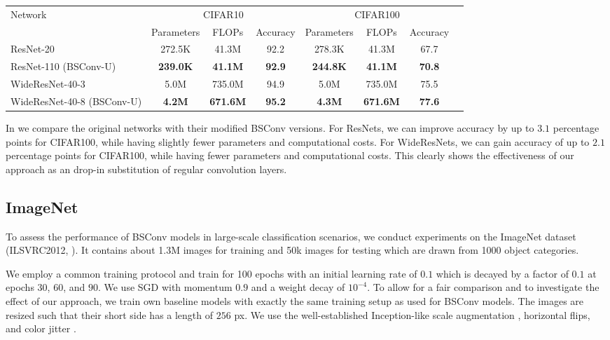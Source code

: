 \documentclass[10pt,twocolumn,letterpaper]{article}
\newcommand{\DCCK}{BSConv\xspace}
\newcommand{\DCCKU}{\DCCK-U\xspace}
\begin{document}
\begin{table*}
	\begin{center}
		\begin{tabular}{|l|c|c|c|c|c|c|c|}
			\hline
			Network & \multicolumn{3}{|c|}{CIFAR10} & \multicolumn{3}{|c|}{CIFAR100} \\
			 &  Parameters & FLOPs & Accuracy & Parameters & FLOPs & Accuracy \\
			\hline
			ResNet-20 \cite{he2016deep} 	& 272.5K & 41.3M & 92.2 & 278.3K & 41.3M & 67.7 \\
			ResNet-110 (\DCCKU) 			& \bf{239.0K} & \bf{41.1M} & \bf{92.9} & \bf{244.8K} & \bf{41.1M} & \bf{70.8} \\
			\hline
			WideResNet-40-3 \cite{zagoruyko2016wide} & 5.0M & 735.0M & 94.9 & 5.0M & 735.0M & 75.5 \\
			WideResNet-40-8 (\DCCKU)	 	& \bf{4.2M} & \bf{671.6M} & \bf{95.2} & \bf{4.3M} & \bf{671.6M} & \bf{77.6} \\
			\hline
			\end{tabular}
		\end{center}
	\caption{ResNets and WideResNets on CIFAR10 and CIFAR100.
		We increase the depth and width factor of each \DCCK model such that its parameter count matches the parameter count of the corresponding baseline model.
	}
	\label{tab:CIFAR-ResNet}
\end{table*}

In  we compare the original networks with their modified \DCCK versions.
For ResNets, we can improve accuracy by up to $3.1$ percentage points for CIFAR100, while having slightly fewer parameters and computational costs.
For WideResNets, we can gain accuracy of up to $2.1$ percentage points for CIFAR100, while having fewer parameters and computational costs.
This clearly shows the effectiveness of our approach as an drop-in substitution of regular convolution layers.

\subsection{ImageNet}
To assess the performance of \DCCK models in large-scale classification scenarios, we conduct experiments on the ImageNet dataset (ILSVRC2012, \cite{russakovsky2015imagenet}).
It contains about 1.3M images for training and 50k images for testing which are drawn from 1000 object categories.

We employ a common training protocol and train for 100 epochs with
an initial learning rate of $0.1$ which is decayed by a factor of $0.1$ at epochs $30$, $60$, and $90$.
We use SGD with momentum $0.9$ and a weight decay of $10^{-4}$.
To allow for a fair comparison and to investigate the effect of our approach, we train own baseline models with exactly the same training setup as used for \DCCK models.
The images are resized such that their short side has a length of $256$ px.
We use the well-established Inception-like scale augmentation \cite{szegedy2015going}, horizontal flips, and color jitter \cite{krizhevsky2012imagenet}.
\end{document}
